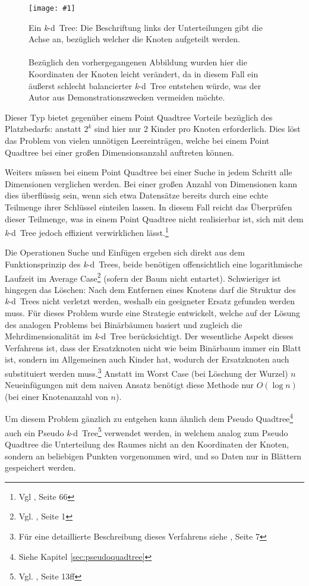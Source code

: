 \documentclass[%
			fontsize=12pt,%
			paper=a4,%
			DIV11,
			liststotoc,
			bibtotoc,
			draft=false,%
			titlepage
			]{scrartcl}
\newcommand{\zit}[3]{#1 \cite{#2}, #3}
\newcommand{\footzit}[3]{\footnote{\zit{#1}{#2}{#3}}}
\newcommand{\kd}{\mbox{\textit{k}-d}}
\newcommand{\myfig}[5] {
 \begin{figure}[tbph]
	 \centering
	 \texttt{[image: \#1]}
	 \caption[#4]{#5}
	 \label{fig:#2}
 \end{figure}
}
\begin{document}
\myfig{img/kdtree-tree-full-trimmed}{kdtree}{width=.78\textwidth}{\kd\ Tree}{Ein \kd\ Tree: Die Beschriftung links der Unterteilungen gibt die Achse an, bezüglich welcher die Knoten aufgeteilt werden.
\\ \\
Bezüglich den vorhergegangenen Abbildung wurden hier die Koordinaten der Knoten leicht verändert, da in diesem Fall ein äußerst schlecht balancierter \kd\ Tree entstehen würde, was der Autor aus Demonstrationszwecken vermeiden möchte.}

Dieser Typ bietet gegenüber einem Point Quadtree Vorteile bezüglich des Platzbedarfs:
anstatt $2^k$ sind hier nur 2 Kinder pro Knoten erforderlich.
Dies löst das Problem von vielen unnötigen Leereinträgen, welche bei einem Point Quadtree bei einer großen Dimensionsanzahl auftreten können.

Weiters müssen bei einem Point Quadtree bei einer Suche in jedem Schritt alle Dimensionen verglichen werden.
Bei einer großen Anzahl von Dimensionen kann dies überflüssig sein, wenn sich etwa Datensätze bereits durch eine echte Teilmenge ihrer Schlüssel einteilen lassen.
In diesem Fall reicht das Überprüfen dieser Teilmenge,
was in einem Point Quadtree nicht realisierbar ist, sich mit dem \kd\ Tree jedoch effizient verwirklichen lässt.\footzit{Vgl}{Samet90}{Seite 66}

Die Operationen Suche und Einfügen ergeben sich direkt aus dem Funktionsprinzip des \kd\ Trees, beide benötigen offensichtlich eine logarithmische Laufzeit im Average Case\footzit{Vgl.}{Bentley:1975}{Seite 1} (sofern der Baum nicht entartet).
Schwieriger ist hingegen das Löschen:
Nach dem Entfernen eines Knotens darf die Struktur des \kd\ Trees nicht verletzt werden, weshalb ein geeigneter Ersatz gefunden werden muss.
Für dieses Problem wurde eine Strategie entwickelt, welche auf der Lösung des analogen Problems bei Binärbäumen basiert und zugleich die Mehrdimensionalität im \kd\ Tree berücksichtigt.
Der wesentliche Aspekt dieses Verfahrens ist, dass der Ersatzknoten nicht wie beim Binärbaum immer ein Blatt ist, sondern im Allgemeinen auch Kinder hat, wodurch der Ersatzknoten auch substituiert werden muss.\footzit{Für eine detaillierte Beschreibung dieses Verfahrens siehe}{Bentley:1975}{Seite 7} 
Anstatt im Worst Case (bei Löschung der Wurzel) $n$ Neueinfügungen mit dem naiven Ansatz benötigt diese Methode nur $O(\log n)$ (bei einer Knotenanzahl von $n$).

Um diesem Problem gänzlich zu entgehen kann ähnlich dem Pseudo Quadtree\footnote{Siehe Kapitel \ref{sec:pseudoquadtree}} auch ein Pseudo \kd\ Tree\footzit{Vgl.}{DBLP:journals/acta/OvermarsL82}{Seite 13ff} verwendet werden,
in welchem analog zum Pseudo Quadtree die Unterteilung des Raumes nicht an den Koordinaten der Knoten, sondern an beliebigen Punkten vorgenommen wird, und so Daten nur in Blättern gespeichert werden.
\end{document}
